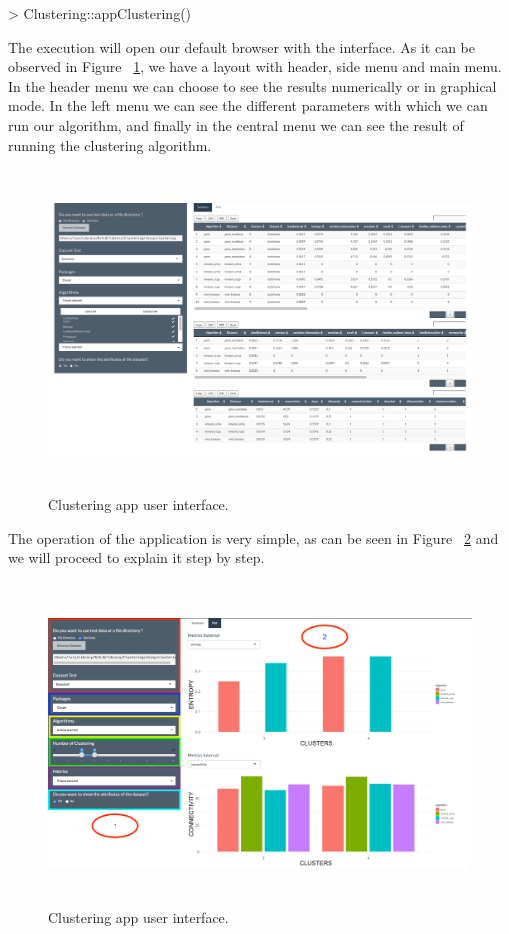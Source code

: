 \begin{Schunk}
\begin{Sinput}
> Clustering::appClustering()
\end{Sinput}
\end{Schunk}

The execution will open our default browser with the interface. As it can be observed in Figure ~\ref{fig:layoutApp}, we have a layout with header, side menu and main menu. In the header menu we can choose to see the results numerically or in graphical mode. In the left menu we can see the different parameters with which we can run our algorithm, and finally in the central menu we can see the result of running the clustering algorithm.

\begin{figure}[htbp]
  \centering
   \includegraphics[width=14cm, height=8.5cm]{img/app}
    \caption{Clustering app user interface.}
    \label{fig:layoutApp}%
\end{figure}
The operation of the application is very simple, as can be seen in Figure ~\ref{fig:layoutApp1} and we will proceed to explain it step by step.

\begin{figure}[htbp]
  \centering
   \includegraphics[width=14cm, height=8.5cm]{img/app1}
    \caption{Clustering app user interface.}
    \label{fig:layoutApp1}%
\end{figure}

